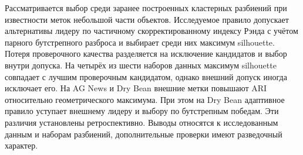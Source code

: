 Рассматривается выбор среди заранее построенных кластерных разбиений при известности меток небольшой части объектов. Исследуемое правило допускает альтернативы лидеру по частичному скорректированному индексу Рэнда с учётом парного бутстрепного разброса и выбирает среди них максимум silhouette. Потеря проверочного качества разделяется на исключение кандидатов и выбор внутри допуска. На четырёх из шести наборов данных максимум silhouette совпадает с лучшим проверочным кандидатом, однако внешний допуск иногда исключает его. На AG News и Dry Bean внешние метки повышают ARI относительно геометрического максимума. При этом на Dry Bean адаптивное правило уступает внешнему лидеру и выбору по бутстрепным победам. Эти различия установлены ретроспективно. Выводы относятся к исследованным данным и наборам разбиений, дополнительные проверки имеют разведочный характер.
